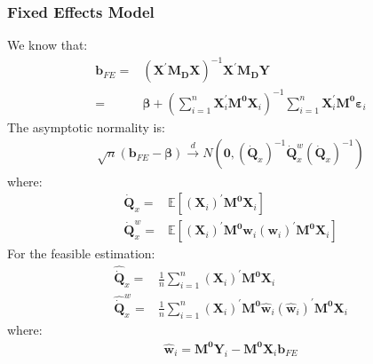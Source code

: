 \documentclass{article}
\begin{document}
\subsubsection{Fixed Effects Model}
We know that:
	\begin{align*}
		\boldsymbol{b}_{FE} = &(\boldsymbol{X}^\prime \boldsymbol{M_D} \boldsymbol{X})^{-1} \boldsymbol{X}^\prime \boldsymbol{M_D} \boldsymbol{Y}\\ = &
		\boldsymbol{\beta} + \left( \sum^n_{i=1} \boldsymbol{X}^\prime_i \boldsymbol{M^0} \boldsymbol{X}_i \right)^{-1} \sum^n_{i=1} \boldsymbol{X}^\prime_i \boldsymbol{M^0} \boldsymbol{\varepsilon}_i
	\end{align*}
The asymptotic normality is:
	\begin{align*}
		\sqrt{n}(\boldsymbol{b}_{FE} - \boldsymbol{\beta}) \xrightarrow{d} N(\boldsymbol{0}, (\dot{\boldsymbol{Q}}_x)^{-1} \dot{\boldsymbol{Q}}^{w}_x (\dot{\boldsymbol{Q}}_x)^{-1})
	\end{align*}
where:
	\begin{align*}
		\dot{\boldsymbol{Q}}_x = &\mathbb{E} [(\boldsymbol{X}_i)^\prime \boldsymbol{M^0} \boldsymbol{X}_i]\\
		\dot{\boldsymbol{Q}}^{w}_x = &\mathbb{E} [(\boldsymbol{X}_i)^\prime \boldsymbol{M^0} \boldsymbol{w}_i (\boldsymbol{w}_i)^\prime \boldsymbol{M^0} \boldsymbol{X}_i]
	\end{align*}
For the feasible estimation:
	\begin{align*}
		\hat{\dot{\boldsymbol{Q}}}_x =& \frac{1}{n} \sum^n_{i=1} (\boldsymbol{X}_i)^\prime \boldsymbol{M^0} \boldsymbol{X}_i\\
		\hat{\dot{\boldsymbol{Q}}}^{w}_x =& \frac{1}{n} \sum^n_{i=1} (\boldsymbol{X}_i)^\prime \boldsymbol{M^0} \hat{\boldsymbol{w}}_i (\hat{\boldsymbol{w}}_i)^\prime \boldsymbol{M^0} \boldsymbol{X}_i 
	\end{align*}
where:
	\begin{align*}
		\hat{\boldsymbol{w}}_i = \boldsymbol{M^0}\boldsymbol{Y}_i - \boldsymbol{M^0} \boldsymbol{X}_i \boldsymbol{b}_{FE}
	\end{align*}
\end{document}
